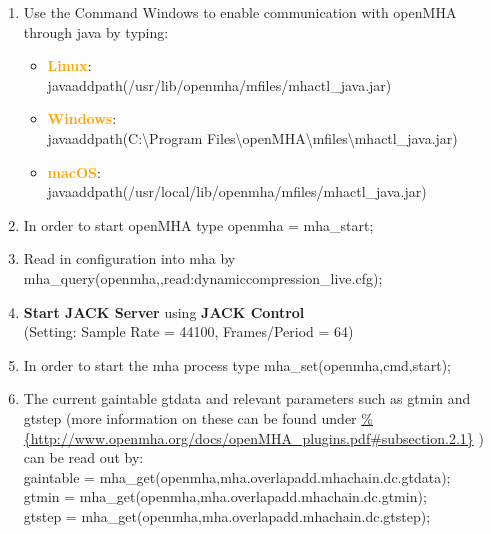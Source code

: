 \documentclass[11pt,a4paper,twoside]{article}
\newcommand{\+}{\discretionary{\mbox{\scriptsize$\hookleftarrow$}}{}{}}
\begin{document}
{{\begin{enumerate}
\item Use the Command Windows to enable communication with openMHA through java by typing: 

\begin{itemize}
\item \textcolor{orange}{\textbf{Linux}}: \\{\ttfamily javaaddpath(\textquotesingle{}/usr/lib/openmha/mfiles/mhactl\_java.jar\textquotesingle{})} 
\item \textcolor{orange}{\textbf{Windows}}: \\ {\ttfamily javaaddpath(\textquotesingle{}C:\textbackslash Program Files\textbackslash openMHA\textbackslash mfiles\textbackslash mhactl\_java.jar\textquotesingle{})}
\item \textcolor{orange}{\textbf{macOS}}: \\ {\ttfamily javaaddpath(\textquotesingle{}/usr/local/lib/openmha/mfiles/mhactl\_java.jar\textquotesingle{})}
\end{itemize}

\item In order to start openMHA type {\ttfamily openmha = mha\_start;} 
\item Read in configuration into mha by \\ {\ttfamily mha\_query(openmha,\textquotesingle{}\textquotesingle{},\textquotesingle{}read:dynamiccompression\_live.cfg\textquotesingle{});}
\item \textbf{Start JACK Server} using \textbf{JACK Control}\\ (Setting: Sample Rate = 44100, Frames/Period = 64)

\item In order to start the mha process type {\ttfamily mha\_set(openmha,\textquotesingle{}cmd\textquotesingle{},\textquotesingle{}start\textquotesingle{});}


\item The current gaintable {\ttfamily gtdata} and relevant parameters such as {\ttfamily gtmin} and {\ttfamily gtstep} (more information on these can be found under {\url{%
          {http://www.openmha.org/docs/openMHA_plugins.pdf#subsection.2.1}}}
\large) can be read out by: \\

{\ttfamily gaintable = mha\_get(openmha,\textquotesingle{}mha.overlapadd.mhachain.dc.gtdata\textquotesingle{});}\\
{\ttfamily gtmin = mha\_get(openmha,\textquotesingle{}mha.overlapadd.mhachain.dc.gtmin\textquotesingle{});}\\
{\ttfamily gtstep = mha\_get(openmha,\textquotesingle{}mha.overlapadd.mhachain.dc.gtstep\textquotesingle{});}




\end{enumerate}}}
\end{document}
